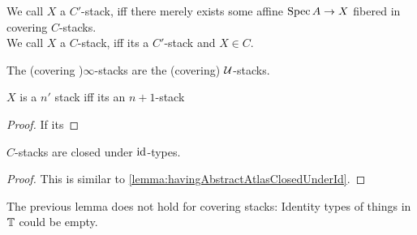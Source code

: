 \documentclass{article}
\begin{document}
\begin{definition}
	We call $X$ a $C'$-stack, iff there merely exists some affine $\operatorname{Spec} A \to X$ fibered in covering $C$-stacks. \\
	We call $X$ a $C$-stack, iff its a $C'$-stack and $X \in C$.
\end{definition}
\begin{definition}
	The (covering )$\infty$-stacks are the (covering) $\mathcal{U}$-stacks.
\end{definition}
\begin{lemma}
	$X$ is a $n'$ stack iff its an $n+1$-stack
\end{lemma}
\begin{proof}
	If its 
\end{proof}
\begin{lemma}{\label{closedUnderId}}
	$C$-stacks are closed under $\operatorname{id}$-types.
\end{lemma}
\begin{proof}
	
	This is similar to \ref{lemma:havingAbstractAtlasClosedUnderId}.
\end{proof}
\begin{warning}
The previous lemma does not hold for covering stacks: Identity types of things in $\mathbb{T}$ could be empty.
\end{warning}
\end{document}
